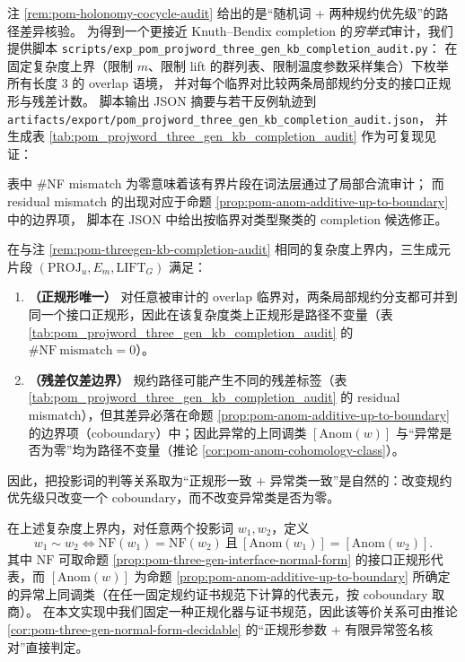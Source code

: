 \begin{remark}\label{rem:pom-threegen-kb-completion-audit}
注 \ref{rem:pom-holonomy-cocycle-audit} 给出的是“随机词 + 两种规约优先级”的路径差异核验。
为得到一个更接近 Knuth--Bendix completion 的\emph{穷举式}审计，我们提供脚本
\texttt{scripts/exp\_pom\_projword\_three\_gen\_kb\_completion\_audit.py}：
在固定复杂度上界（限制 \(m\)、限制 lift 的群列表、限制温度参数采样集合）下枚举所有长度 \(3\) 的 overlap 语境，
并对每个临界对比较两条局部规约分支的接口正规形与残差计数。
脚本输出 JSON 摘要与若干反例轨迹到
\texttt{artifacts/export/pom\_projword\_three\_gen\_kb\_completion\_audit.json}，
并生成表 \ref{tab:pom_projword_three_gen_kb_completion_audit} 作为可复现见证：

\noindent 表中 \(\#\)NF mismatch 为零意味着该有界片段在词法层通过了局部合流审计；
而 residual mismatch 的出现对应于命题 \ref{prop:pom-anom-additive-up-to-boundary} 中的边界项，
脚本在 JSON 中给出按临界对类型聚类的 completion 候选修正。
\end{remark}

\begin{proposition}\label{prop:pom-confluence-mod-anom-audited}
在与注 \ref{rem:pom-threegen-kb-completion-audit} 相同的复杂度上界内，三生成元片段 \((\mathrm{PROJ}_u,E_m,\mathrm{LIFT}_G)\) 满足：
\begin{enumerate}
  \item \textbf{（正规形唯一）} 对任意被审计的 overlap 临界对，两条局部规约分支都可并到同一个接口正规形，因此在该复杂度类上正规形是路径不变量（表 \ref{tab:pom_projword_three_gen_kb_completion_audit} 的 \(\#\mathrm{NF\ mismatch}=0\)）。
  \item \textbf{（残差仅差边界）} 规约路径可能产生不同的残差标签（表 \ref{tab:pom_projword_three_gen_kb_completion_audit} 的 residual mismatch），但其差异必落在命题 \ref{prop:pom-anom-additive-up-to-boundary} 的边界项（coboundary）中；因此异常的上同调类 \([\mathrm{Anom}(w)]\) 与“异常是否为零”均为路径不变量（推论 \ref{cor:pom-anom-cohomology-class}）。
\end{enumerate}
因此，把投影词的判等关系取为“正规形一致 + 异常类一致”是自然的：改变规约优先级只改变一个 coboundary，而不改变异常类是否为零。
\end{proposition}

\begin{definition}\label{def:pom-algorithmic-equivalence-nf-anom}
在上述复杂度上界内，对任意两个投影词 \(w_1,w_2\)，定义
\[
w_1\sim w_2
\iff
\mathrm{NF}(w_1)=\mathrm{NF}(w_2)
\ \text{且}\
[\mathrm{Anom}(w_1)]=[\mathrm{Anom}(w_2)].
\]
其中 \(\mathrm{NF}\) 可取命题 \ref{prop:pom-three-gen-interface-normal-form} 的接口正规形代表，而 \([\mathrm{Anom}(w)]\) 为命题 \ref{prop:pom-anom-additive-up-to-boundary} 所确定的异常上同调类（在任一固定规约证书规范下计算的代表元，按 coboundary 取商）。
在本文实现中我们固定一种正规化器与证书规范，因此该等价关系可由推论 \ref{cor:pom-three-gen-normal-form-decidable} 的“正规形参数 + 有限异常签名核对”直接判定。
\end{definition}

